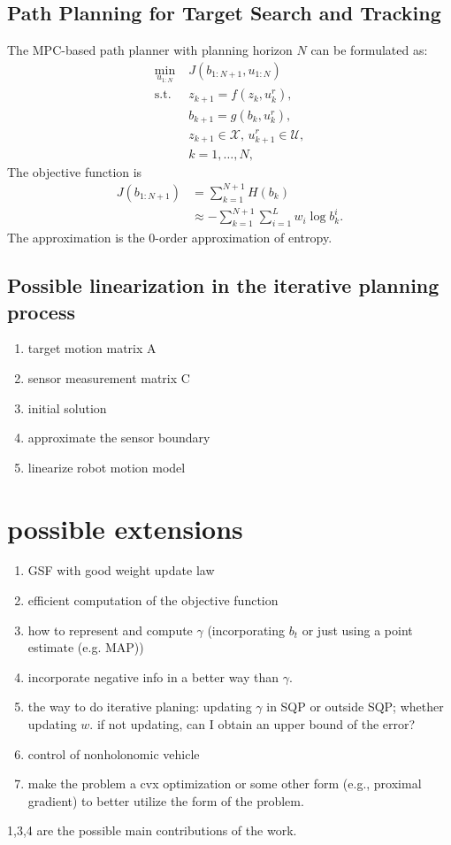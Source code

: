 \documentclass[letterpaper, 10 pt, conference]{ieeeconf}  %
\begin{document}
\subsection{Path Planning for Target Search and Tracking}
The MPC-based path planner with planning horizon $N$ can be formulated as:
\begin{subequations}
	\begin{align}
	\min_{u_{1:N}}\; & J(b_{1:N+1},u_{1:N})\\
	\text{s.t. }\; & z_{k+1}=f(z_k,u^r_k),\\
	& b_{k+1}=g(b_k,u^r_k),\\
	& z_{k+1}\in\mathcal{X}, \, u^r_{k+1}\in\mathcal{U},\\
	& k=1,\dots,N,
	\end{align}\label{eqn:MPC}
\end{subequations}
The objective function is
\begin{align}
J(b_{1:N+1})&=\sum\limits_{k=1}^{N+1} H(b_k)\\ %
& \approx -\sum\limits_{k=1}^{N+1} \sum\limits_{i=1}^{L}w_i\log b^i_k.
\end{align}
The approximation is the $0$-order approximation of entropy.

\subsection{Possible linearization in the iterative planning process}
\begin{enumerate}
	\item target motion matrix A
	\item sensor measurement matrix C
	\item initial solution
	\item approximate the sensor boundary
	\item linearize robot motion model
\end{enumerate}

\section{possible extensions}
\begin{enumerate}
	\item GSF with good weight update law
	\item efficient computation of the objective function
	\item how to represent and compute $\gamma$ (incorporating $b_t$ or just using a point estimate (e.g. MAP))
	\item incorporate negative info in a better way than $\gamma$.
	\item the way to do iterative planing: updating $\gamma$ in SQP or outside SQP; whether updating $w$. if not updating, can I obtain an upper bound of the error?
	\item control of nonholonomic vehicle
	\item make the problem a cvx optimization or some other form (e.g., proximal gradient) to better utilize the form of the problem.
\end{enumerate}
1,3,4 are the possible main contributions of the work.
\end{document}
